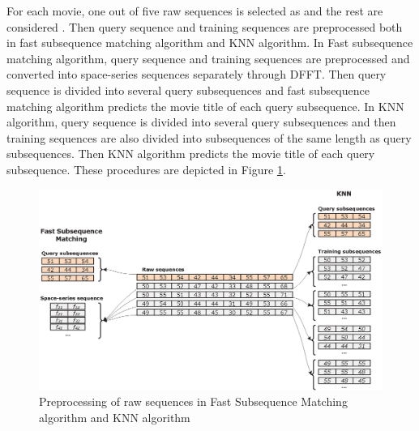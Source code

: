 For each movie, one out of five raw sequences is selected as  and the rest are considered .
Then query sequence and training sequences are preprocessed both in fast subsequence matching algorithm and KNN algorithm. 
In Fast subsequence matching algorithm, query sequence and training sequences are preprocessed and converted into space-series sequences separately through DFFT.
Then query sequence is divided into several query subsequences and fast subsequence matching algorithm predicts the movie title of each query subsequence. 
In KNN algorithm, query sequence is divided into several query subsequences and then training sequences are also divided into subsequences of the same length as query subsequences. 
Then KNN algorithm predicts the movie title of each query subsequence. 
These procedures are depicted in Figure \ref{fig:train_test_set}.

\begin{figure}[!t]
\centering
\includegraphics[scale=0.60]{Figures/TrainTestSet}
\caption{Preprocessing of raw sequences in Fast Subsequence Matching algorithm and KNN algorithm}
\label{fig:train_test_set}
\end{figure}






